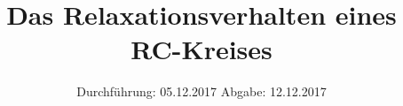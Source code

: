 

\subject{V353}
\title{Das Relaxationsverhalten eines RC-Kreises}
\date{%
  Durchführung: 05.12.2017
  \hspace{3em}
  Abgabe: 12.12.2017
}



\maketitle
\thispagestyle{empty}
\tableofcontents
\newpage






\printbibliography{}


